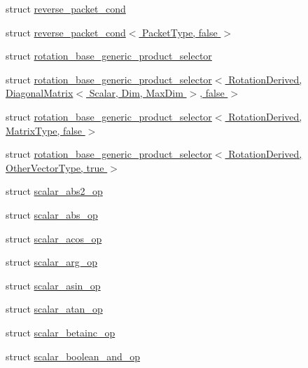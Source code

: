 \begin{DoxyCompactItemize}
\item 
struct \hyperlink{struct_eigen_1_1internal_1_1reverse__packet__cond}{reverse\+\_\+packet\+\_\+cond}
\item 
struct \hyperlink{struct_eigen_1_1internal_1_1reverse__packet__cond_3_01_packet_type_00_01false_01_4}{reverse\+\_\+packet\+\_\+cond$<$ Packet\+Type, false $>$}
\item 
struct \hyperlink{struct_eigen_1_1internal_1_1rotation__base__generic__product__selector}{rotation\+\_\+base\+\_\+generic\+\_\+product\+\_\+selector}
\item 
struct \hyperlink{struct_eigen_1_1internal_1_1rotation__base__generic__product__selector_3_01_rotation_derived_00_7e855ad9d8f41d04ee2e0f10c5040984}{rotation\+\_\+base\+\_\+generic\+\_\+product\+\_\+selector$<$ Rotation\+Derived, Diagonal\+Matrix$<$ Scalar, Dim, Max\+Dim $>$, false $>$}
\item 
struct \hyperlink{struct_eigen_1_1internal_1_1rotation__base__generic__product__selector_3_01_rotation_derived_00_01_matrix_type_00_01false_01_4}{rotation\+\_\+base\+\_\+generic\+\_\+product\+\_\+selector$<$ Rotation\+Derived, Matrix\+Type, false $>$}
\item 
struct \hyperlink{struct_eigen_1_1internal_1_1rotation__base__generic__product__selector_3_01_rotation_derived_00_945228ddac360fee065f79280b8a793b}{rotation\+\_\+base\+\_\+generic\+\_\+product\+\_\+selector$<$ Rotation\+Derived, Other\+Vector\+Type, true $>$}
\item 
struct \hyperlink{struct_eigen_1_1internal_1_1scalar__abs2__op}{scalar\+\_\+abs2\+\_\+op}
\item 
struct \hyperlink{struct_eigen_1_1internal_1_1scalar__abs__op}{scalar\+\_\+abs\+\_\+op}
\item 
struct \hyperlink{struct_eigen_1_1internal_1_1scalar__acos__op}{scalar\+\_\+acos\+\_\+op}
\item 
struct \hyperlink{struct_eigen_1_1internal_1_1scalar__arg__op}{scalar\+\_\+arg\+\_\+op}
\item 
struct \hyperlink{struct_eigen_1_1internal_1_1scalar__asin__op}{scalar\+\_\+asin\+\_\+op}
\item 
struct \hyperlink{struct_eigen_1_1internal_1_1scalar__atan__op}{scalar\+\_\+atan\+\_\+op}
\item 
struct \hyperlink{struct_eigen_1_1internal_1_1scalar__betainc__op}{scalar\+\_\+betainc\+\_\+op}
\item 
struct \hyperlink{struct_eigen_1_1internal_1_1scalar__boolean__and__op}{scalar\+\_\+boolean\+\_\+and\+\_\+op}

\end{DoxyCompactItemize}
